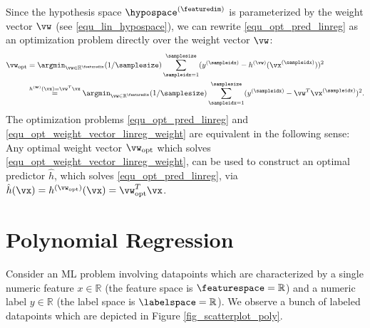 \documentclass[12pt]{report}
\begin{document}
Since the hypothesis space $\hypospace^{(\featuredim)} $ is 
parameterized by the weight vector $\vw$ (see \eqref{equ_lin_hypospace}), 
we can rewrite \eqref{equ_opt_pred_linreg} as an optimization 
problem directly over the weight vector $\vw$: 
\begin{align} 
\label{equ_opt_weight_vector_linreg_weight}
\vw_{\rm opt} &  = \argmin_{\vw \in \mathbb{R}^{\featuredim}} (1/\samplesize) \sum_{\sampleidx=1}^{\samplesize} (y^{(\sampleidx)} - h^{(\vw)}(\vx^{(\sampleidx)}))^{2} \nonumber \\
& \stackrel{h^{(\mathbf{w})}(\vx) = \vw^{T} \vx}{=} \argmin_{\vw \in \mathbb{R}^{\featuredim}} (1/\samplesize) \sum_{\sampleidx=1}^{\samplesize} (y^{(\sampleidx)} - \vw^{T} \vx^{(\sampleidx)})^{2}.
\end{align} 
The optimization problems \eqref{equ_opt_pred_linreg} and \eqref{equ_opt_weight_vector_linreg_weight} 
are equivalent in the following sense: Any optimal weight vector $\vw_{\rm opt}$ which solves 
\eqref{equ_opt_weight_vector_linreg_weight}, can be used to 
construct an optimal predictor $\hat{h}$, which solves 
\eqref{equ_opt_pred_linreg}, via $\hat{h}(\vx) = h^{(\vw_{\rm opt})}(\vx) = \vw_{\rm opt}^{T} \vx$. 


\section{Polynomial Regression} 
\label{sec_polynomial_regression}


Consider an ML problem involving datapoints which are characterized by a 
single numeric feature $x \in  \mathbb{R}$ (the feature space is $\featurespace= \mathbb{R}$) 
and a numeric label $y \in \mathbb{R}$ (the label space is $\labelspace= \mathbb{R}$). 
We observe a bunch of labeled datapoints which are depicted in Figure \ref{fig_scatterplot_poly}. 
\end{document}
